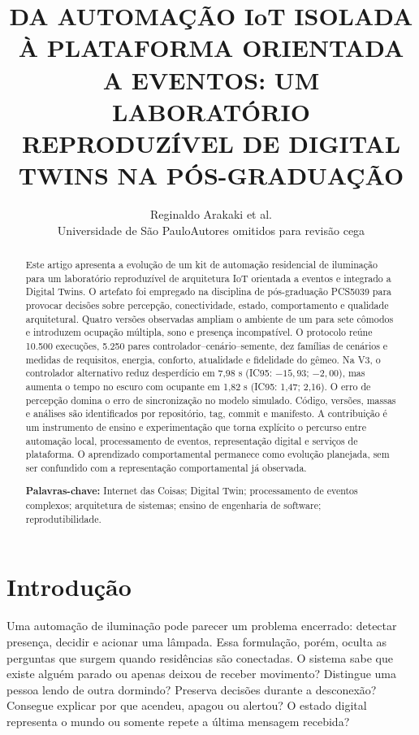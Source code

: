 \documentclass[10pt,a4paper]{article}
\title{\vspace{-1.2cm}\bfseries\large DA AUTOMAÇÃO IoT ISOLADA À PLATAFORMA ORIENTADA A EVENTOS: UM LABORATÓRIO REPRODUZÍVEL DE DIGITAL TWINS NA PÓS-GRADUAÇÃO}
\author{\ifcameraReady Reginaldo Arakaki et al.\\Universidade de São Paulo\else Autores omitidos para revisão cega\fi}
\date{}
\begin{document}
\maketitle
\vspace{-1.2cm}

\begin{abstract}
Este artigo apresenta a evolução de um kit de automação residencial de iluminação para um laboratório reproduzível de arquitetura IoT orientada a eventos e integrado a Digital Twins. O artefato foi empregado na disciplina de pós-graduação PCS5039 para provocar decisões sobre percepção, conectividade, estado, comportamento e qualidade arquitetural. Quatro versões observadas ampliam o ambiente de um para sete cômodos e introduzem ocupação múltipla, sono e presença incompatível. O protocolo reúne 10.500 execuções, 5.250 pares controlador--cenário--semente, dez famílias de cenários e medidas de requisitos, energia, conforto, atualidade e fidelidade do gêmeo. Na V3, o controlador alternativo reduz desperdício em 7,98 s (IC95: $-15{,}93$; $-2{,}00$), mas aumenta o tempo no escuro com ocupante em 1,82 s (IC95: 1,47; 2,16). O erro de percepção domina o erro de sincronização no modelo simulado. Código, versões, massas e análises são identificados por repositório, tag, commit e manifesto. A contribuição é um instrumento de ensino e experimentação que torna explícito o percurso entre automação local, processamento de eventos, representação digital e serviços de plataforma. O aprendizado comportamental permanece como evolução planejada, sem ser confundido com a representação comportamental já observada.

\textbf{Palavras-chave:} Internet das Coisas; Digital Twin; processamento de eventos complexos; arquitetura de sistemas; ensino de engenharia de software; reprodutibilidade.
\end{abstract}

\section{Introdução}

Uma automação de iluminação pode parecer um problema encerrado: detectar presença, decidir e acionar uma lâmpada. Essa formulação, porém, oculta as perguntas que surgem quando residências são conectadas. O sistema sabe que existe alguém parado ou apenas deixou de receber movimento? Distingue uma pessoa lendo de outra dormindo? Preserva decisões durante a desconexão? Consegue explicar por que acendeu, apagou ou alertou? O estado digital representa o mundo ou somente repete a última mensagem recebida?
\end{document}
